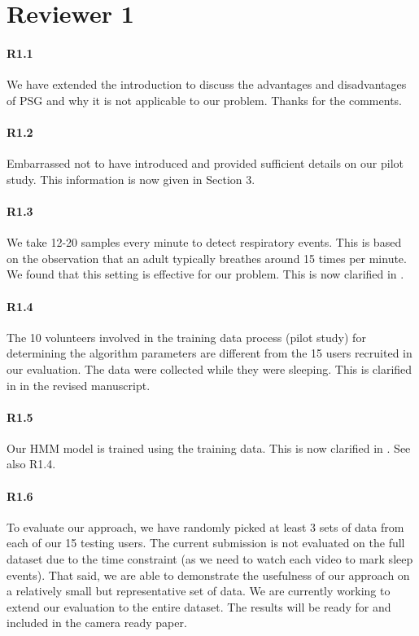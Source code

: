 \section*{Reviewer 1}

\paragraph{R1.1} We have extended the introduction to discuss the advantages and disadvantages of PSG and why it is not applicable to our
problem. Thanks for the comments.

\paragraph{R1.2} Embarrassed not to have introduced and provided sufficient details on our pilot study. This information is now given in Section 3.

\paragraph{R1.3} We take 12-20 samples every minute to detect respiratory events. This is based on the observation that an adult typically
breathes around 15 times per minute. We found that this setting is effective for our problem. This is now clarified in .

\paragraph{R1.4} The 10 volunteers involved in the training data process (pilot study) for determining the algorithm parameters are different from the 15 users recruited in our
evaluation. The data were collected while they were sleeping. This is clarified in  in the revised manuscript.

\paragraph{R1.5} Our HMM model is trained using the training data. This is now clarified in . See also R1.4.
\vspace{-2mm}
\paragraph{R1.6} To evaluate our approach, we have randomly picked at least 3 sets of data from each of our 15 testing users.
The current submission is not evaluated on the full dataset due to the time constraint (as we need to watch each video to mark sleep
events). That said, we are able to demonstrate the usefulness of our approach on a relatively small but representative set of data. We are
currently working to extend our evaluation to the entire dataset. The results will be ready for and included in the camera ready paper.

